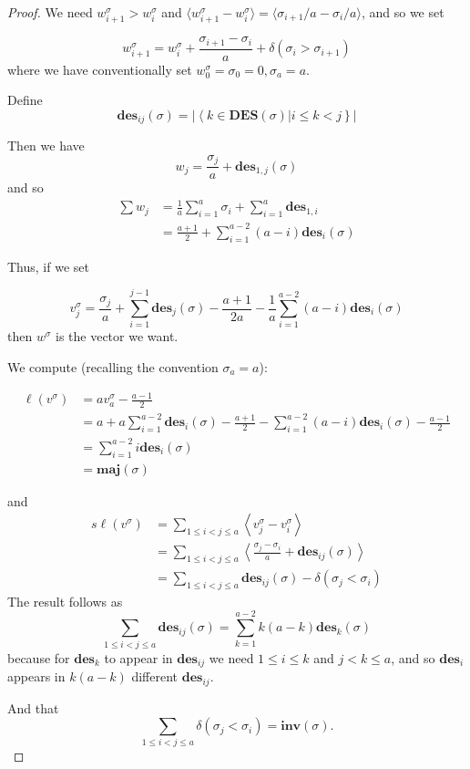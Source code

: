 \documentclass{amsart}[12pt]
\theoremstyle{definition}
\newcommand{\sk}{s\ell}
\newcommand{\inv}{\mathbf{inv}}
\newcommand{\DES}{\mathbf{DES}}
\newcommand{\des}{\mathbf{des}}
\newcommand{\maj}{\mathbf{maj}}
\begin{document}
\begin{proof}
We need $w^\sigma_{i+1}>w^\sigma_i$ and $\langle w^\sigma_{i+1}-w^\sigma_i\rangle=\langle\sigma_{i+1}/a-\sigma_i/a\rangle$, and so we set

$$w^\sigma_{i+1}=w^\sigma_i+\frac{\sigma_{i+1}-\sigma_i}{a}+\delta(\sigma_i>\sigma_{i+1})$$
where we have conventionally set $w^\sigma_0=\sigma_0=0, \sigma_a=a$.

Define $$\des_{ij}(\sigma)=\left|\left\langle k\in\DES(\sigma)\big| i\leq k < j\right\}\right|$$

Then we have $$w_j=\frac{\sigma_j}{a}+\des_{1,j}(\sigma)$$
and so
\begin{align*}
\sum w_j &=\frac{1}{a}\sum_{i=1}^a \sigma_i +\sum_{i=1}^a \des_{1,i} \\
 &=\frac{a+1}{2}+\sum_{i=1}^{a-2} (a-i)\des_i(\sigma)
\end{align*}

Thus, if we set

$$v^\sigma_j=\frac{\sigma_j}{a}+\sum_{i=1}^{j-1} \des_j(\sigma)-\frac{a+1}{2a}-\frac{1}{a}\sum_{i=1}^{a-2} (a-i)\des_i(\sigma)$$
then $w^\sigma$ is the vector we want.

We compute (recalling the convention $\sigma_a=a$):

\begin{align*}
\ell(v^\sigma) &= a v^\sigma_a-\frac{a-1}{2} \\
&=a+a\sum_{i=1}^{a-2} \des_i(\sigma)-\frac{a+1}{2}-\sum_{i=1}^{a-2} (a-i)\des_i(\sigma)-\frac{a-1}{2} \\
&=\sum_{i=1}^{a-2} i\des_i(\sigma) \\
&=\maj(\sigma)
\end{align*}

and
\begin{align*}
\sk (v^\sigma) &=\sum_{1\leq i <j \leq a} \left\langle v^\sigma_j-v^\sigma_i\right\rangle \\
&=\sum_{1\leq i <j \leq a} \left\langle\frac{\sigma_j-\sigma_i}{a}+\des_{ij}(\sigma)\right\rangle \\
&=\sum_{1\leq i<j\leq a} \des_{ij}(\sigma)-\delta(\sigma_j<\sigma_i)
\end{align*}
The result follows as
$$\sum_{1\leq i<j\leq a} \des_{ij}(\sigma)=\sum_{k=1}^{a-2} k(a-k)\des_k(\sigma)$$
because for $\des_k$ to appear in $\des_{ij}$ we need $1\leq i\leq k$ and $j<k\leq a$, and so $\des_i$ appears in $k(a-k)$ different $\des_{ij}$.

And that $$\sum_{1\leq i<j\leq a} \delta(\sigma_j<\sigma_i)=\inv(\sigma).$$  



\end{proof}
\end{document}
